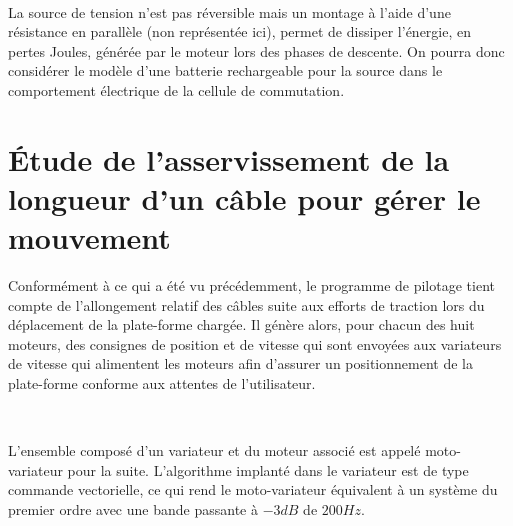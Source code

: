 ~\

La source de tension n'est pas réversible mais un montage à l'aide d'une résistance en parallèle (non représentée ici), permet de dissiper l'énergie, en pertes Joules, générée par le moteur lors des phases de descente. On pourra donc considérer le modèle d'une batterie rechargeable pour la source dans le comportement électrique de la cellule de commutation.




\section{Étude de l’asservissement de la longueur d’un câble pour gérer
le mouvement}


Conformément à ce qui a été vu précédemment, le programme de pilotage tient compte de l’allongement relatif des câbles suite aux efforts de traction lors du déplacement de la plate-forme chargée. Il génère alors, pour chacun des huit moteurs, des consignes de position et de vitesse qui sont envoyées aux variateurs de vitesse qui alimentent les moteurs afin d’assurer un positionnement de la plate-forme conforme aux attentes de l’utilisateur.

~\

L’ensemble composé d’un variateur et du moteur associé est appelé moto-variateur pour la suite. L’algorithme implanté dans le variateur est de type commande vectorielle, ce qui rend le moto-variateur équivalent à un système du premier ordre avec une bande passante à $-3dB$ de $200Hz$.

